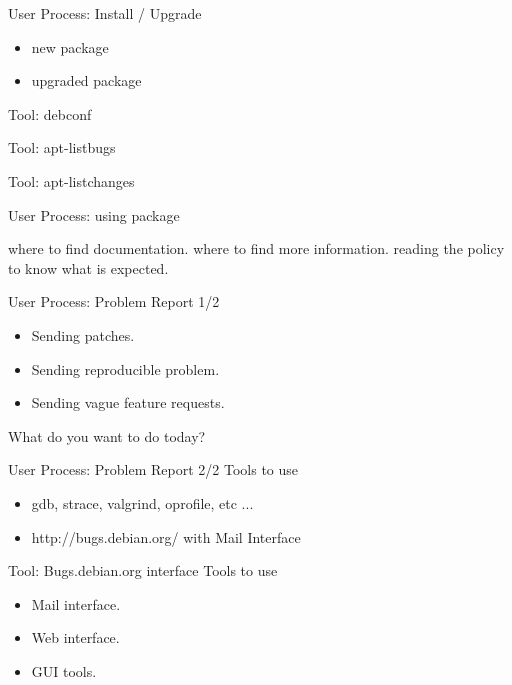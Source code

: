 \documentclass[cjk,dvipdfm,12pt]{beamer}
\begin{document}
\begin{frame}{User Process: Install / Upgrade}
 \begin{itemize}
  \item new package
  \item upgraded package
 \end{itemize}
\end{frame}

\begin{frame}{Tool: debconf}
\end{frame}

\begin{frame}{Tool: apt-listbugs}
\end{frame}

\begin{frame}{Tool: apt-listchanges}
\end{frame}

\begin{frame}{User Process: using package}

where to find documentation.
where to find more information.
reading the policy to know what is expected.

\end{frame}

\begin{frame}{User Process: Problem Report 1/2}
\begin{itemize}
 \item Sending patches.
 \item Sending reproducible problem.
 \item Sending vague feature requests.
\end{itemize}

What do you want to do today?
\end{frame}

\begin{frame}{User Process: Problem Report 2/2}
Tools to use 
\begin{itemize}
 \item gdb, strace, valgrind, oprofile, etc ... 
 \item http://bugs.debian.org/ with Mail Interface
\end{itemize} 
\end{frame}

\begin{frame}{Tool: Bugs.debian.org interface}
Tools to use 
\begin{itemize}
 \item Mail interface.
 \item Web interface.
 \item GUI tools.
\end{itemize} 
\end{frame}
\end{document}
